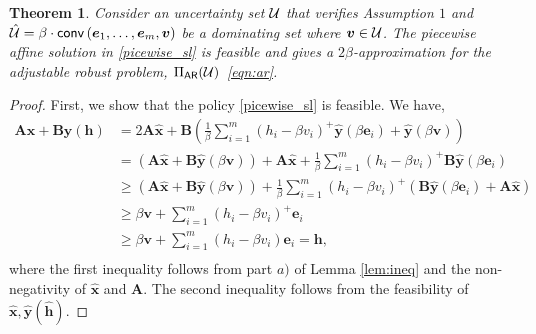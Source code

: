 \documentclass[11pt]{article}
\theoremstyle{plain}
\newtheorem{theorem}{Theorem}[section]
\theoremstyle{definition}
\numberwithin{equation}{section}%
\numberwithin{equation}{section}%
\newcommand{\mb}[1]{\ensuremath{\boldsymbol{#1}}}
\begin{document}
\begin{theorem} \label{thm:cost}
Consider an uncertainty set ${\cal U}$ that verifies Assumption $1$ and  $\hat{\cal U} = \beta \cdot {\sf conv } \left( \mb e_1,\ldots,\mb e_m, \mb v \right)$ be a dominating set where $ \mb v \in {\cal U}$. The piecewise affine solution in \eqref{picewise_sl} is feasible and gives a $2\beta$-approximation for the adjustable robust problem, $\Pi_{\sf AR}({\cal U})$~\eqref{eqn:ar}.
\end{theorem}
\begin{proof}
First, we show that the policy \eqref{picewise_sl} is feasible. We have,
 \begin{align*}
\mb A \mb x + \mb B \mb y ( \mb h ) &=    2 \mb A \hat{\mb x}  + \mb B \left(\frac{1}{\beta} \sum_{i=1}^m\left( h_i -\beta v_i  \right)^+ \hat{\mb y }( \beta \mb e_i)+ \hat{\mb y }(\beta \mb v) \right)\\
&=  \left(  \mb A \hat{\mb x}+\mb B \hat{\mb y }( \beta\mb v ) \right)  +
 \mb A \hat{\mb x} + \frac{1}{\beta} \sum_{i=1}^m \left( h_i -\beta v_i  \right)^+ \mb B \hat{\mb y }( \beta  \mb e_i)\\
 &\geq \left(  \mb A \hat{\mb x}+\mb B \hat{\mb y }( \beta \mb v ) \right)  +
 \frac{1}{\beta} \sum_{i=1}^m \left( h_i -\beta v_i \right)^+ \left( \mb B \hat{\mb y }( \beta \mb e_i)  + \mb A \hat{\mb x} \right) \\
  &\geq \beta \mb v+
 \sum_{i=1}^m \left( h_i -\beta v_i  \right)^+  \mb e_i  \\
 &\geq \beta \mb v  +      \sum_{i=1}^m \left( h_i -\beta v_i \right)    \mb e_i = \mb h,\\
\end{align*}
where the first inequality follows from part $a)$ of Lemma \ref{lem:ineq} and the non-negativity of $\hat{\mb x}$ and $ \mb A$. The second inequality follows from the feasibility of $   \mb{\hat{x}},  \mb{\hat{y}(\hat{h})}$.


\end{proof}
\end{document}
